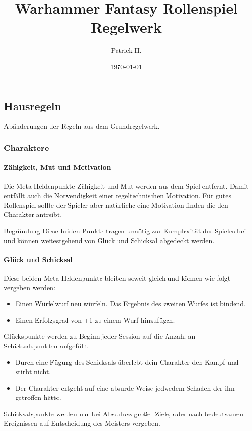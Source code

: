 \documentclass[a4paper]{article}
\title{Warhammer Fantasy Rollenspiel\\Regelwerk}
\author{Patrick H.}
\date{\today}
\begin{document}

\maketitle
\tableofcontents

\vspace{1em}

\begin{multicols}{2}
  

\part{Hausregeln}
Abänderungen der Regeln aus dem Grundregelwerk.


\section{Charaktere}

\subsection{Zähigkeit, Mut und Motivation}
Die Meta-Heldenpunkte Zähigkeit und Mut werden aus dem Spiel entfernt. 
Damit entfällt auch die Notwendigkeit einer regeltechnischen Motivation. 
Für gutes Rollenspiel sollte der Spieler aber natürliche eine Motivation finden die den Charakter antreibt.

\begin{DndComment}{Begründung}
  Diese beiden Punkte tragen unnötig zur Komplexität des Spieles bei und können weitestgehend von Glück und Schicksal abgedeckt werden.
\end{DndComment}

\subsection{Glück und Schicksal}
Diese beiden Meta-Heldenpunkte bleiben soweit gleich und können wie folgt vergeben werden:
\begin{itemize}
  \item Einen Würfelwurf neu würfeln. Das Ergebnis des zweiten Wurfes ist bindend.
  \item Einen Erfolgsgrad von +1 zu einem Wurf hinzufügen.
\end{itemize}
Glückspunkte werden zu Beginn jeder Session auf die Anzahl an Schicksalspunkten aufgefüllt.

\begin{itemize}
  \item Durch eine Fügung des Schicksals überlebt dein Charakter den Kampf und stirbt nicht.
  \item Der Charakter entgeht auf eine absurde Weise jedwedem Schaden der ihn getroffen hätte.
\end{itemize}
Schicksalspunkte werden nur bei Abschluss großer Ziele, oder nach bedeutsamen Ereignissen auf Entscheidung des Meisters vergeben.


\end{multicols}
\end{document}
